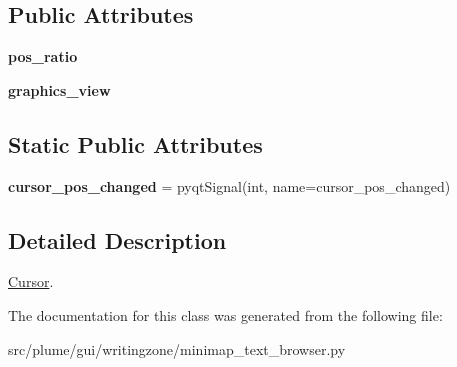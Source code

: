 \subsection*{Public Attributes}
\begin{DoxyCompactItemize}
\item 
{\bfseries pos\+\_\+ratio}\hypertarget{classplume-creator_1_1src_1_1plume_1_1gui_1_1writingzone_1_1minimap__text__browser_1_1_cursor_a93cc5f9a42185ac31213c3ba4ede9789}{}\label{classplume-creator_1_1src_1_1plume_1_1gui_1_1writingzone_1_1minimap__text__browser_1_1_cursor_a93cc5f9a42185ac31213c3ba4ede9789}

\item 
{\bfseries graphics\+\_\+view}\hypertarget{classplume-creator_1_1src_1_1plume_1_1gui_1_1writingzone_1_1minimap__text__browser_1_1_cursor_abf7d21ba26c7bebeab5dc91796811769}{}\label{classplume-creator_1_1src_1_1plume_1_1gui_1_1writingzone_1_1minimap__text__browser_1_1_cursor_abf7d21ba26c7bebeab5dc91796811769}

\end{DoxyCompactItemize}
\subsection*{Static Public Attributes}
\begin{DoxyCompactItemize}
\item 
{\bfseries cursor\+\_\+pos\+\_\+changed} = pyqt\+Signal(int, name=\textquotesingle{}cursor\+\_\+pos\+\_\+changed\textquotesingle{})\hypertarget{classplume-creator_1_1src_1_1plume_1_1gui_1_1writingzone_1_1minimap__text__browser_1_1_cursor_ac9f37cdaa0023a2f76bd9093215c4792}{}\label{classplume-creator_1_1src_1_1plume_1_1gui_1_1writingzone_1_1minimap__text__browser_1_1_cursor_ac9f37cdaa0023a2f76bd9093215c4792}

\end{DoxyCompactItemize}


\subsection{Detailed Description}
\hyperlink{classplume-creator_1_1src_1_1plume_1_1gui_1_1writingzone_1_1minimap__text__browser_1_1_cursor}{Cursor}. 

The documentation for this class was generated from the following file\+:\begin{DoxyCompactItemize}
\item 
src/plume/gui/writingzone/minimap\+\_\+text\+\_\+browser.\+py\end{DoxyCompactItemize}
